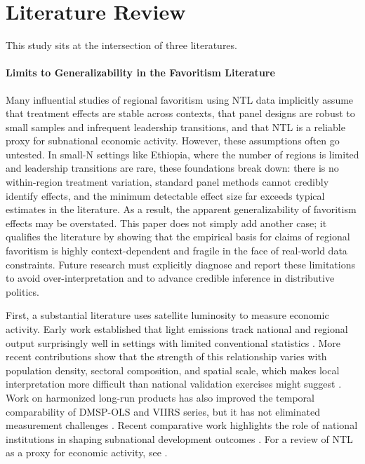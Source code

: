 \documentclass[12pt,a4paper]{article}
\begin{document}
\section{Literature Review}

This study sits at the intersection of three literatures.

\paragraph{Limits to Generalizability in the Favoritism Literature}
Many influential studies of regional favoritism using NTL data implicitly assume that treatment effects are stable across contexts, that panel designs are robust to small samples and infrequent leadership transitions, and that NTL is a reliable proxy for subnational economic activity. However, these assumptions often go untested. In small-N settings like Ethiopia, where the number of regions is limited and leadership transitions are rare, these foundations break down: there is no within-region treatment variation, standard panel methods cannot credibly identify effects, and the minimum detectable effect size far exceeds typical estimates in the literature. As a result, the apparent generalizability of favoritism effects may be overstated. This paper does not simply add another case; it qualifies the literature by showing that the empirical basis for claims of regional favoritism is highly context-dependent and fragile in the face of real-world data constraints. Future research must explicitly diagnose and report these limitations to avoid over-interpretation and to advance credible inference in distributive politics.

First, a substantial literature uses satellite luminosity to measure economic activity. Early work established that light emissions track national and regional output surprisingly well in settings with limited conventional statistics \citep{Chen2011,Henderson2012}. More recent contributions show that the strength of this relationship varies with population density, sectoral composition, and spatial scale, which makes local interpretation more difficult than national validation exercises might suggest \citep{Bluhm2022,Gibson2021}. Work on harmonized long-run products has also improved the temporal comparability of DMSP-OLS and VIIRS series, but it has not eliminated measurement challenges \citep{Li2023,Gibson2024}. Recent comparative work highlights the role of national institutions in shaping subnational development outcomes \citep{MichalopoulosPapaioannou2014}. For a review of NTL as a proxy for economic activity, see \citep{Elvidge2021}.
\end{document}
